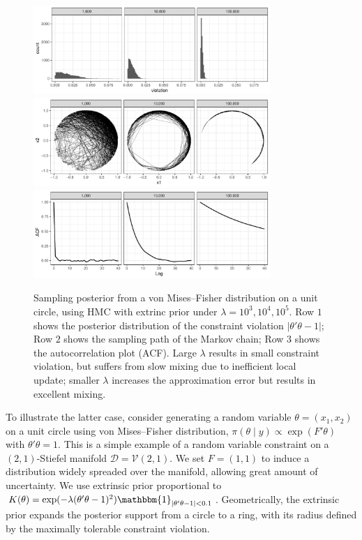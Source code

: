 \documentclass[10pt]{article}
\newcommand{\mc}[1]{\mathcal{#1}}
\begin{document}
\begin{figure}[H]
 \centering
  \includegraphics[width=0.8\textwidth]{unit_circle_violation}
 \includegraphics[width=0.8\textwidth]{unit_circle_path}
 \includegraphics[width=0.8\textwidth]{unit_circle_acf}
\caption{Sampling posterior from a von Mises--Fisher distribution on a unit circle, using HMC with extrinc prior under $\lambda=10^3,10^4,10^5$. Row $1$ shows the posterior distribution of the constraint violation $|\theta'\theta -1|$; Row $2$ shows the sampling path of the Markov chain; Row $3$ shows the autocorrelation plot (ACF). Large $\lambda$ results in small constraint violation, but suffers from slow mixing due to inefficient local update; smaller $\lambda$ increases the approximation error but results in excellent mixing.}
\label{unit_circle}
\end{figure}

To illustrate the latter case, consider generating a random variable $\theta=(x_1,x_2)$ on a unit circle using von Mises--Fisher distribution, $\pi(\theta \mid y) \propto \exp(F'\theta)$ with $\theta'\theta =1$. This is a simple example of a random variable constraint on a $(2,1)$-Stiefel manifold $\mc D =\mc V(2,1)$. We set $F=(1,1)$ to induce a distribution widely spreaded over the manifold, allowing great amount of uncertainty. We use extrinsic prior proportional to $K(\theta)= \exp(-\lambda (\theta'\theta -1)^2) \mathbbm{1}_{|\theta'\theta -1|<0.1}$. Geometrically, the extrinsic prior expands the posterior support from a circle to a ring, with its radius defined by the maximally tolerable constraint violation. 
\end{document}
